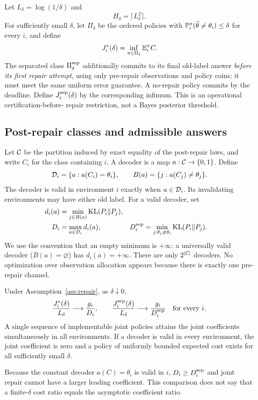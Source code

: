 Let $L_\delta=\log(1/\delta)$ and
\begin{equation}\label{eq:horizon}
 H_\delta=\lceil L_\delta^2\rceil.
\end{equation}
For sufficiently small $\delta$, let $\Pi_\delta$ be the ordered policies
with $\mathbb P_i^\pi(\widehat\theta\ne\theta_i)\le\delta$ for every $i$, and define
\[
 J_i^*(\delta)=\inf_{\pi\in\Pi_\delta}\mathbb E_i^\pi C.
\]
The separated class $\Pi_\delta^{\rm sep}$ additionally commits to its final
old-label answer \emph{before its first repair attempt}, using only pre-repair
observations and policy coins; it must meet the same uniform error guarantee.
A no-repair policy commits by the deadline. Define $J_i^{\rm sep}(\delta)$
by the corresponding infimum. This is an operational certification-before-
repair restriction, not a Bayes posterior threshold.

\subsection{Post-repair classes and admissible answers}
Let $\mathcal C$ be the partition induced by exact equality of the post-repair
laws, and write $C_i$ for the class containing $i$. A decoder is a map
$a:\mathcal C\to\{0,1\}$. Define
\begin{equation}\label{eq:answers}
 \mathcal D_i=\{a:a(C_i)=\theta_i\},\qquad
 B(a)=\{j:a(C_j)\ne\theta_j\}.
\end{equation}
The decoder is valid in environment $i$ exactly when $a\in\mathcal D_i$.
Its invalidating environments may have either old label.
For a valid decoder, set
\begin{align}
 d_i(a)&=\min_{j\in B(a)}\operatorname{KL}(P_i\Vert P_j),\\
 D_i&=\max_{a\in\mathcal D_i}d_i(a),&
 D_i^{\rm sep}&=\min_{j:\theta_j\ne\theta_i}\operatorname{KL}(P_i\Vert P_j).
 \label{eq:rates}
\end{align}
We use the convention that an empty minimum is $+\infty$: a universally valid
decoder ($B(a)=\varnothing$) has $d_i(a)=+\infty$.
There are only $2^{|\mathcal C|}$ decoders. No optimization over observation
allocation appears because there is exactly one pre-repair channel.

\begin{theorem}\label{thm:main}
Under Assumption~\ref{ass:repair}, as $\delta\downarrow0$,
\begin{equation}\label{eq:main}
 \frac{J_i^*(\delta)}{L_\delta}\longrightarrow\frac{g_i}{D_i},
 \qquad
 \frac{J_i^{\rm sep}(\delta)}{L_\delta}\longrightarrow
 \frac{g_i}{D_i^{\rm sep}}\quad\text{for every }i.
\end{equation}
A single sequence of implementable joint policies attains the joint
coefficients simultaneously in all environments. If a decoder is valid in
every environment, the joint coefficient is zero and a policy of uniformly
bounded expected cost exists for all sufficiently small $\delta$.
\end{theorem}
Because the constant decoder $a(C)=\theta_i$ is valid in $i$,
$D_i\ge D_i^{\rm sep}$ and joint repair cannot have a larger leading
coefficient. This comparison does not say that a finite-$\delta$ cost ratio
equals the asymptotic coefficient ratio.

